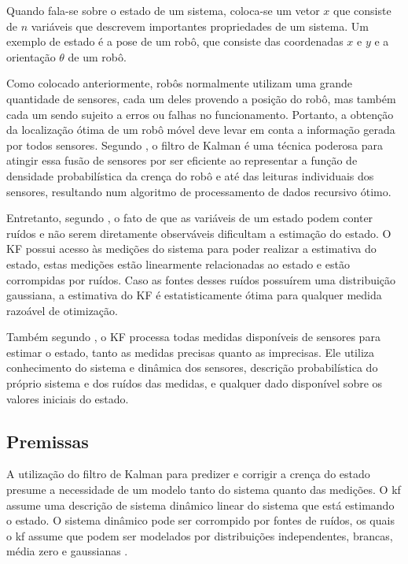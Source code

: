 \documentclass[acronym, symbols, table]{fei}
\begin{document}
			Quando fala-se sobre o estado de um sistema, coloca-se um vetor $x$ que consiste de $n$ variáveis que descrevem importantes propriedades de um sistema. Um exemplo de estado é a pose de um robô, que consiste das coordenadas $x$ e $y$ e a orientação $\theta$ de um robô.
			
			Como colocado anteriormente, robôs normalmente utilizam uma grande quantidade de sensores, cada um deles provendo a posição do robô, mas também cada um sendo sujeito a erros ou falhas no funcionamento. Portanto, a obtenção da localização ótima de um robô móvel deve levar em conta a informação gerada por todos sensores. Segundo \textcite{siegwart2011introduction}, o filtro de Kalman é uma técnica poderosa para atingir essa fusão de sensores por ser eficiente ao representar a função de densidade probabilística da crença do robô e até das leituras individuais dos sensores, resultando num algoritmo de processamento de dados recursivo ótimo.
			
			Entretanto, segundo \textcite{phdthesisNegenborn}, o fato de que as variáveis de um estado podem conter ruídos e não serem diretamente observáveis dificultam a estimação do estado. O KF possui acesso às medições do sistema para poder realizar a estimativa do estado, estas medições estão linearmente relacionadas ao estado e estão corrompidas por ruídos. Caso as fontes desses ruídos possuírem uma distribuição gaussiana, a estimativa do KF é estatisticamente ótima para qualquer medida razoável de otimização.
			
			Também segundo \textcite{phdthesisNegenborn}, o KF processa todas medidas disponíveis de sensores para estimar o estado, tanto as medidas precisas quanto as imprecisas. Ele utiliza conhecimento do sistema e dinâmica dos sensores, descrição probabilística do próprio sistema e dos ruídos das medidas, e qualquer dado disponível sobre os valores iniciais do estado.
			
		\subsection{Premissas}
		
			A utilização do filtro de Kalman para predizer e corrigir a crença do estado presume a necessidade de um modelo tanto do sistema quanto das medições. O \acrshort{kf} assume uma descrição de sistema dinâmico linear do sistema que está estimando o estado. O sistema dinâmico pode ser corrompido por fontes de ruídos, os quais o \acrshort{kf} assume que podem ser modelados por distribuições independentes, brancas, média zero e gaussianas \cite{urrea2021kalman}.
			
\end{document}
